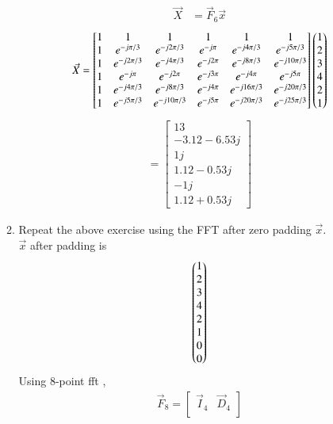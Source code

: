 \documentclass[journal,12pt,twocolumn]{IEEEtran}
\renewcommand\thesection{\arabic{section}}
\begin{document}
\begin{enumerate}[label=\thesection.\arabic*]
\begin{enumerate}[label=\arabic*.,ref=\thesection.\theenumi]
     \begin{align}
       \vec{X}&=\vec{F}_6\vec{x}
     \end{align}
     \begin{align}
       \vec{X}=\begin{bmatrix}
         1&1&1&1&1&1\\1&e^{-j \pi/3 }&e^{-j 2 \pi/3 }&e^{-j \pi }&e^{-j 4 \pi/3 }&e^{-j 5 \pi/3 }\\1&e^{-j 2 \pi/3 }&e^{-j 4 \pi/3 }&e^{-j 2 \pi }&e^{-j 8\pi/3 }&e^{-j 10 \pi/3 }\\1&e^{-j \pi }&e^{-j 2 \pi }&e^{-j 3 \pi }&e^{-j 4 \pi }&e^{-j 5 \pi }\\1&e^{-j 4 \pi/3 }&e^{-j 8 \pi/3 }&e^{-j 4 \pi }&e^{-j 16 \pi/3 }&e^{-j 20 \pi/3 }\\1&e^{-j 5 \pi/3 }&e^{-j 10 \pi/3 }&e^{-j 5 \pi }&e^{-j 20 \pi/3 }&e^{-j 25 \pi/3 }
       \end{bmatrix} \begin{pmatrix}1\\2\\3\\4\\2\\1\end{pmatrix}
     \end{align}
     \begin{align}
       =\begin{bmatrix}
         13\\-3.12-6.53j\\1j\\1.12-0.53j\\-1j\\1.12+0.53j
       \end{bmatrix}
     \end{align}
     \item Repeat the above exercise using the FFT
     after zero padding $\vec{x}$.\\
     \solution $\vec{x}$ after padding is 
     \begin{align}
       \begin{pmatrix}1\\2\\3\\4\\2\\1\\0\\0\end{pmatrix}
     \end{align}
     Using 8-point fft ,
     \begin{align}
       \vec{F}_{8}=
       \begin{bmatrix}
         \vec{I}_{4} & \vec{D}_{4} \\

\end{bmatrix}
\end{align}
\end{enumerate}
\end{enumerate}
\end{document}
